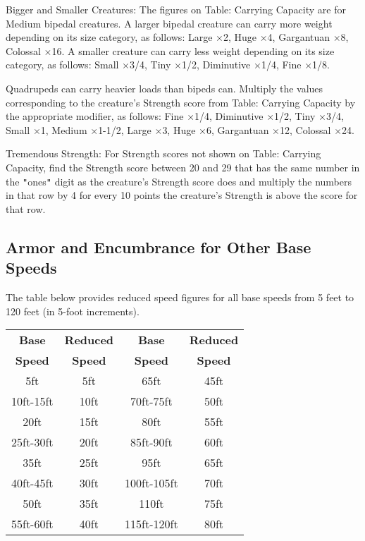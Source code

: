 Bigger and Smaller Creatures: The figures on Table: Carrying Capacity are for Medium bipedal creatures. A larger bipedal creature can carry more weight depending on its size category, as follows: Large \mbox{$\times$}2, Huge \mbox{$\times$}4, Gargantuan \mbox{$\times$}8, Colossal \mbox{$\times$}16. A smaller creature can carry less weight depending on its size category, as follows: Small \mbox{$\times$}3/4, Tiny \mbox{$\times$}1/2, Diminutive \mbox{$\times$}1/4, Fine \mbox{$\times$}1/8.
				
Quadrupeds can carry heavier loads than bipeds can. Multiply the values corresponding to the creature's Strength score from Table: Carrying Capacity by the appropriate modifier, as follows: Fine \mbox{$\times$}1/4, Diminutive \mbox{$\times$}1/2, Tiny \mbox{$\times$}3/4, Small \mbox{$\times$}1, Medium \mbox{$\times$}1-1/2, Large \mbox{$\times$}3, Huge \mbox{$\times$}6, Gargantuan \mbox{$\times$}12, Colossal \mbox{$\times$}24.
				
Tremendous Strength: For Strength scores not shown on Table: Carrying Capacity, find the Strength score between 20 and 29 that has the same number in the \texttt{{}"{}}ones\texttt{{}"{}} digit as the creature's Strength score does and multiply the numbers in that row by 4 for every 10 points the creature's Strength is above the score for that row.
				


\subsection{Armor and Encumbrance for Other Base Speeds}

The table below provides reduced speed figures for all base speeds from 5 feet to 120 feet (in 5-foot increments).

\begin{tabular}{cc|cc}
\textbf{Base} & \textbf{Reduced} & \textbf{Base} & \textbf{Reduced} \\
\textbf{Speed} & \textbf{Speed} & \textbf{Speed} & \textbf{Speed}\\
5ft       & 5ft  & 65ft & 45ft\\
10ft-15ft & 10ft & 70ft-75ft & 50ft\\
20ft      & 15ft & 80ft & 55ft\\
25ft-30ft & 20ft & 85ft-90ft & 60ft\\
35ft      & 25ft & 95ft & 65ft\\
40ft-45ft & 30ft & 100ft-105ft & 70ft\\
50ft      & 35ft & 110ft & 75ft\\
55ft-60ft & 40ft & 115ft-120ft & 80ft\\
\end{tabular}

